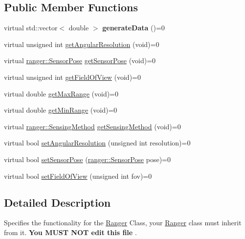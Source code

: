 \subsection*{Public Member Functions}
\begin{DoxyCompactItemize}
\item 
\mbox{\label{classRangerInterface_a969c670cadf55a15733809116dc305c8}} 
virtual std\+::vector$<$ double $>$ {\bfseries generate\+Data} ()=0
\item 
virtual unsigned int \hyperlink{classRangerInterface_a37d4f89daffa8b2708dfc11034893552}{get\+Angular\+Resolution} (void)=0
\item 
virtual \hyperlink{structranger_1_1SensorPose}{ranger\+::\+Sensor\+Pose} \hyperlink{classRangerInterface_a7f6db3f603d997ad6c5aa5c7778261f4}{get\+Sensor\+Pose} (void)=0
\item 
virtual unsigned int \hyperlink{classRangerInterface_a18716da6932402b8dda75f682be6f06c}{get\+Field\+Of\+View} (void)=0
\item 
virtual double \hyperlink{classRangerInterface_a0bb29a41de5767c99081002c0590c186}{get\+Max\+Range} (void)=0
\item 
virtual double \hyperlink{classRangerInterface_ae6d501ddeeaad4a7b44d7d51ce64cb88}{get\+Min\+Range} (void)=0
\item 
virtual \hyperlink{namespaceranger_ab04465c229cc50595ffe40a891a3b135}{ranger\+::\+Sensing\+Method} \hyperlink{classRangerInterface_aeb06b9835f2b162b81917bd27797549b}{get\+Sensing\+Method} (void)=0
\item 
virtual bool \hyperlink{classRangerInterface_aecffc9bbb58379da741c18326b9e41db}{set\+Angular\+Resolution} (unsigned int resolution)=0
\item 
virtual bool \hyperlink{classRangerInterface_a452301937b5ace7ded943d8aa76a061f}{set\+Sensor\+Pose} (\hyperlink{structranger_1_1SensorPose}{ranger\+::\+Sensor\+Pose} pose)=0
\item 
virtual bool \hyperlink{classRangerInterface_a70357ca516198af45e2d503ef6af8f9f}{set\+Field\+Of\+View} (unsigned int fov)=0
\end{DoxyCompactItemize}


\subsection{Detailed Description}
Specifies the functionality for the \hyperlink{classRanger}{Ranger} Class, your \hyperlink{classRanger}{Ranger} class must inherit from it. {\bfseries  You M\+U\+ST N\+OT edit this file }. 

